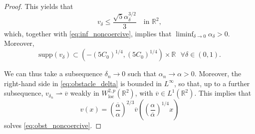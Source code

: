 \documentclass[10pt,a4paper]{amsart}
\newcommand{\RR}{\mathbb{R}}
\newcommand{\faskip}{\hspace{8pt}}
\newcommand{\loc}{\mathrm{loc}}
\newcommand{\supp}{\mathrm{supp}}
\begin{document}
\begin{proof}
	This yields that 
	\[
		v_{\delta} \leq \frac{\sqrt{5}\alpha_{\delta}^{3/2}}{3} \faskip \text{ in } \RR^{2},
	\]
	which, together with \eqref{eq:inf_noncoercive}, implies that $ \liminf_{\delta \rightarrow 0} \alpha_{\delta} > 0 $. Moreover,
	\[
		\supp (v_{\delta})\subset (-(5C_0)^{1/4}, (5C_0)^{1/4}) \times \RR \faskip \forall \delta \in (0,1).
	\]

	We can thus take a subsequence $ \delta_n \rightarrow 0 $ such that $ \alpha_{n} \rightarrow \alpha > 0$. Moreover, the right-hand side in \eqref{eq:obstacle_delta} is bounded in $ L^{\infty} $, so that, up to a further subsequence, $ v_{\delta_n} \rightharpoonup \overline{v} $ weakly in $ W^{2,p}_{\loc}(\RR^{2}) $, with $ \overline{v} \in L^{1}(\RR^{2}) $. This implies that 
	\[ 
		v(x) = \left( \frac{\overline{\alpha}}{\alpha} \right)^{2/3} \overline{v}\left( \left( \frac{\alpha}{\overline{\alpha}} \right)^{1/4} x \right)
	\]
solves \eqref{eq:obst_noncoercive}.
\end{proof}
\end{document}
